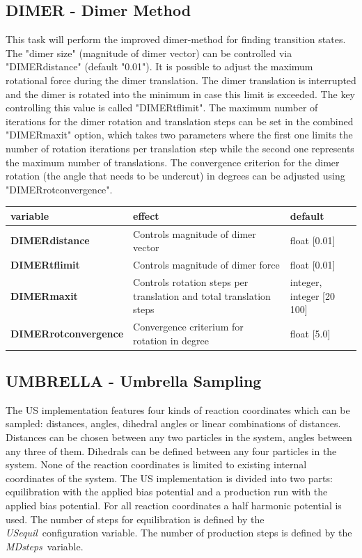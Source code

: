 \documentclass[10pt,a4paper]{article} %
\begin{document}
	\subsection{DIMER - Dimer Method}
	This task will perform the improved dimer-method for finding transition states\supercite{dimermethod}. The "dimer size" (magnitude of dimer vector) can be controlled via "DIMERdistance" (default "0.01").
	It is possible to adjust the maximum rotational force during the dimer translation. The dimer translation is interrupted and the dimer is rotated into the minimum in case this limit is exceeded. The key controlling this value is called "DIMERtflimit".
	The maximum number of iterations for the dimer rotation and translation steps can be set in the combined "DIMERmaxit" option, which takes two parameters where the first one limits the number of rotation iterations per translation step while the second one represents the maximum number of translations.
	The convergence criterion for the dimer rotation (the angle that needs to be undercut) in degrees can be adjusted using "DIMERrotconvergence".
		
	\begin{longtable}{|p{4cm}|p{3.5cm}|p{2.5cm}|}
		variable & effect & default \\
		\hline
		\textbf{DIMERdistance} & Controls magnitude of dimer vector & float [0.01] \\
		\textbf{DIMERtflimit} & Controls magnitude of dimer force & float [0.01] \\
		\textbf{DIMERmaxit}& Controls rotation steps per translation and total translation steps & integer, integer [20 100]\\
		\textbf{DIMERrotconvergence} & Convergence criterium for rotation in degree & float [5.0] \\
	\end{longtable}
	
	\subsection{UMBRELLA - Umbrella Sampling} \label{sec:umbrella}
	The \acf{US}\supercite{umbrellasampling1, umbrellasampling2, umbrellasamplingreview} implementation features four kinds of reaction coordinates which can be sampled: distances, angles, dihedral angles or linear combinations of distances. Distances can be chosen between any two particles in the system, angles between any three of them. Dihedrals can be defined between any four particles in the system. None of the reaction coordinates is limited to existing internal coordinates of the system.
	The \acl{US} implementation is divided into two parts: equilibration with the applied bias potential and a production run with the applied bias potential. For all reaction coordinates a half harmonic potential is used. The number of steps for equilibration is defined by the \glqq\textit{USequil}\grqq~configuration variable. The number of production steps is defined by the \glqq\textit{MDsteps}\grqq~variable.
\end{document}
